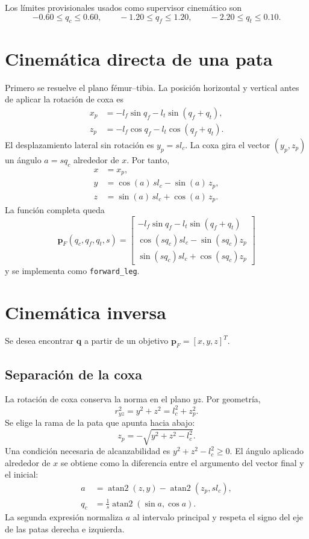 \documentclass[11pt,a4paper]{article}
\newcommand{\vect}[1]{\boldsymbol{#1}}
\newcommand{\atan}{\operatorname{atan2}}
\begin{document}
Los límites provisionales usados como supervisor cinemático son
\[
-0.60\le q_c\le0.60,\qquad
-1.20\le q_f\le1.20,\qquad
-2.20\le q_t\le0.10.
\]

\section{Cinemática directa de una pata}
Primero se resuelve el plano fémur--tibia. La posición horizontal y vertical
antes de aplicar la rotación de coxa es
\begin{align}
x_p &= -l_f\sin q_f-l_t\sin(q_f+q_t),\\
z_p &= -l_f\cos q_f-l_t\cos(q_f+q_t).
\end{align}
El desplazamiento lateral sin rotación es $y_p=s l_c$. La coxa gira el vector
$(y_p,z_p)$ un ángulo $a=sq_c$ alrededor de $x$. Por tanto,
\begin{align}
x &= x_p,\\
y &= \cos(a)\,s l_c-\sin(a)\,z_p,\\
z &= \sin(a)\,s l_c+\cos(a)\,z_p.
\end{align}
La función completa queda
\[
\boxed{
\vect p_F(q_c,q_f,q_t,s)=
\begin{bmatrix}
-l_f\sin q_f-l_t\sin(q_f+q_t)\\
\cos(sq_c)s l_c-\sin(sq_c)z_p\\
\sin(sq_c)s l_c+\cos(sq_c)z_p
\end{bmatrix}}
\]
y se implementa como \texttt{forward\_leg}.

\section{Cinemática inversa}
Se desea encontrar $\vect q$ a partir de un objetivo
$\vect p_F=[x,y,z]^T$.

\subsection{Separación de la coxa}
La rotación de coxa conserva la norma en el plano $yz$. Por geometría,
\[
r_{yz}^2=y^2+z^2=l_c^2+z_p^2.
\]
Se elige la rama de la pata que apunta hacia abajo:
\[
\boxed{z_p=-\sqrt{y^2+z^2-l_c^2}}.
\]
Una condición necesaria de alcanzabilidad es
$y^2+z^2-l_c^2\ge0$. El ángulo aplicado alrededor de $x$ se obtiene como
la diferencia entre el argumento del vector final y el inicial:
\begin{align}
a &= \atan(z,y)-\atan(z_p,s l_c),\\
q_c &= \boxed{\frac{1}{s}\atan(\sin a,\cos a)}.
\end{align}
La segunda expresión normaliza $a$ al intervalo principal y respeta el signo
del eje de las patas derecha e izquierda.
\end{document}
